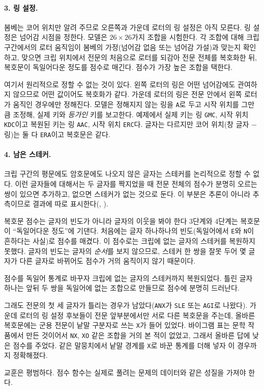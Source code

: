 \paragraph{3. 링 설정.} 봄베는 코어 위치만 알려 주므로 오른쪽과 가운데 로터의 링 설정은 아직 모른다.
링 설정은 넘어감 시점을 정한다. 모델은 $26\times26$가지 조합을 시험한다. 각 조합에 대해 크립 구간에서의
로터 움직임이 봄베의 가정(넘어감 없음 또는 넘어감 가설)과 맞는지 확인하고, 맞으면 크립 위치에서 전문의
처음으로 로터를 되감아 전문 전체를 복호화한 뒤, 복호문이 독일어다운 정도를 점수로 매긴다. 점수가 가장 높은
조합을 택한다.

여기서 원리적으로 정할 수 없는 것이 있다. 왼쪽 로터의 링은 어떤 넘어감에도 관여하지 않으므로 어떤
값이어도 복호화가 같다. 가운데 로터의 링은 전문 안에서 왼쪽 로터가 움직인 경우에만 정해진다. 모델은
정해지지 않는 링을 \texttt{A}로 두고 시작 위치를 그만큼 조정해, 실제 키와 \emph{등가인} 키를 보고한다.
예제에서 실제 키는 링 \texttt{GMC}, 시작 위치 \texttt{KDC}이고 복원된 키는 링 \texttt{AAC}, 시작 위치
\texttt{ERC}다. 글자는 다르지만 코어 위치(창 글자 $-$ 링)는 둘 다 \texttt{ERA}이고 복호문은 같다.

\paragraph{4. 남은 스테커.} 크립 구간의 평문에도 암호문에도 나오지 않은 글자는 스테커를 논리적으로
정할 수 없다. 이런 글자들에 대해서는 두 글자를 짝지었을 때 전문 전체의 점수가 분명히 오르는 쌍이 있으면
추가하고, 없으면 스테커가 없는 것으로 둔다. 이 부분은 추론이 아니라 추측이므로 결과에 따로
표시한다(, ).

\begin{lesson}{복호문 점수는 글자의 빈도가 아니라 글자의 이웃을 봐야 한다}
3단계와 4단계는 복호문이 ``독일어다운 정도''에 기댄다. 처음에는 글자 하나하나의 빈도(독일어에서
\texttt{E}와 \texttt{N}이 흔하다는 사실)로 점수를 매겼다. 이 점수로는 크립에 없는 글자의 스테커를
복원하지 못했다. 글자의 빈도는 글자의 \emph{순서}를 보지 않으므로, 스테커 한 쌍을 잘못 두어 몇 글자가
다른 글자로 바뀌어도 점수가 거의 움직이지 않기 때문이다.

점수를 독일어  통계로 바꾸자 크립에 없는 글자의 스테커까지
복원되었다. 틀린 글자 하나는 앞뒤 두 쌍을 독일어에 없는 조합으로 만들므로 점수에 분명히 드러난다.

그래도 전문의 첫 세 글자가 틀리는 경우가 남았다(\texttt{ANX}가 \texttt{SLE} 또는 \texttt{AGI}로 나왔다).
가운데 로터의 링 설정 후보들이 전문 앞부분에서만 서로 다른 복호문을 주는데, 올바른 복호문에는 군용 전문이
낱말 구분자로 쓰는 \texttt{X}가 들어 있었다. 바이그램 표는 문학 작품에서 만든 것이어서 \texttt{NX},
\texttt{XO} 같은 조합을 거의 본 적이 없었고, 그래서 올바른 답에 낮은 점수를 주었다. 같은 말뭉치에서
낱말 경계를 \texttt{X}로 바꾼 통계를 더해 넣자 이 경우까지 정확해졌다.

교훈은 평범하다. 점수 함수는 실제로 풀려는 문제의 데이터와 같은 성질을 가져야 한다.
\end{lesson}

